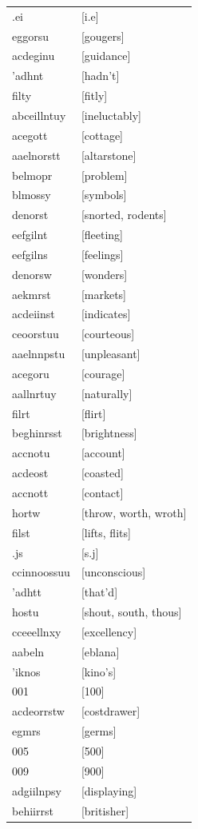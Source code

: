 \documentclass{article}
\begin{document}
\begin{tabular}{ll}
.ei & [i.e] \\
eggorsu & [gougers] \\
acdeginu & [guidance] \\
'adhnt & [hadn't] \\
filty & [fitly] \\
abceillntuy & [ineluctably] \\
acegott & [cottage] \\
aaelnorstt & [altarstone] \\
belmopr & [problem] \\
blmossy & [symbols] \\
denorst & [snorted, rodents] \\
eefgilnt & [fleeting] \\
eefgilns & [feelings] \\
denorsw & [wonders] \\
aekmrst & [markets] \\
acdeiinst & [indicates] \\
ceoorstuu & [courteous] \\
aaelnnpstu & [unpleasant] \\
acegoru & [courage] \\
aallnrtuy & [naturally] \\
filrt & [flirt] \\
beghinrsst & [brightness] \\
accnotu & [account] \\
acdeost & [coasted] \\
accnott & [contact] \\
hortw & [throw, worth, wroth] \\
filst & [lifts, flits] \\
.js & [s.j] \\
ccinnoossuu & [unconscious] \\
'adhtt & [that'd] \\
hostu & [shout, south, thous] \\
cceeellnxy & [excellency] \\
aabeln & [eblana] \\
'iknos & [kino's] \\
001 & [100] \\
acdeorrstw & [costdrawer] \\
egmrs & [germs] \\
005 & [500] \\
009 & [900] \\
adgiilnpsy & [displaying] \\
behiirrst & [britisher] \\

\end{tabular}
\end{document}
